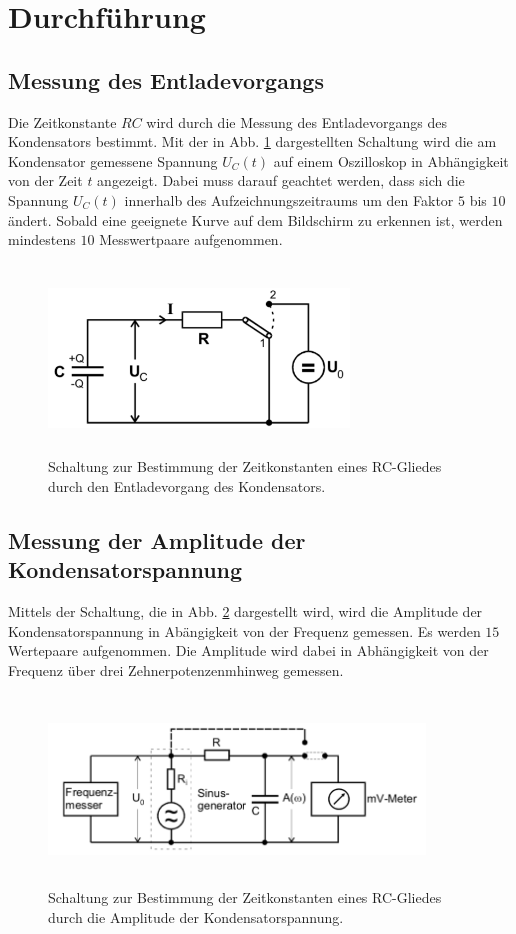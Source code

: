 \section{Durchführung}
\label{sec:Durchführung}

\subsection{Messung des Entladevorgangs}
Die Zeitkonstante $RC$ wird durch die Messung des Entladevorgangs des Kondensators bestimmt. 
Mit der in Abb. \ref{fig:4a} dargestellten Schaltung wird die am Kondensator gemessene Spannung $U_{C}(t)$ auf einem
Oszilloskop in Abhängigkeit von der Zeit $t$ angezeigt. Dabei muss darauf geachtet werden, dass sich die Spannung 
$U_{C}(t)$ innerhalb des Aufzeichnungszeitraums um den Faktor $5$ bis $10$ ändert. Sobald eine geeignete Kurve auf dem 
Bildschirm zu erkennen ist, werden mindestens $10$ Messwertpaare aufgenommen.
\begin{figure}
  \centering
  \includegraphics[width= 8cm, height=5cm]{build/4a.png}
  \caption{Schaltung zur Bestimmung der Zeitkonstanten eines RC-Gliedes durch den Entladevorgang des Kondensators.}
  \label{fig:4a}
\end{figure}

\subsection{Messung der Amplitude der Kondensatorspannung}
Mittels der Schaltung, die in Abb. \ref{fig:4b} dargestellt wird, wird die Amplitude der Kondensatorspannung in 
Abängigkeit von der Frequenz gemessen. Es werden $15$ Wertepaare aufgenommen.
Die Amplitude wird dabei in Abhängigkeit von der Frequenz über drei Zehnerpotenzenmhinweg gemessen.
\begin{figure}
  \centering
  \includegraphics[width=10cm, height=5cm]{build/4b.png}
  \caption{Schaltung zur Bestimmung der Zeitkonstanten eines RC-Gliedes durch die Amplitude der Kondensatorspannung.}
  \label{fig:4b}
\end{figure}

